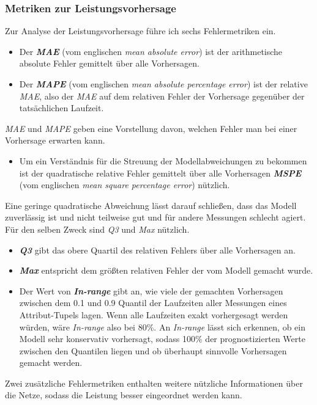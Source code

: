 \documentclass[
	12pt,
	a4paper,
	BCOR10mm,
	DIV14,
	listof=totoc,
	bibliography=totoc,
	headsepline
]{scrreprt}
\begin{document}
\subsubsection{Metriken zur Leistungsvorhersage}
Zur Analyse der Leistungsvorhersage führe ich sechs Fehlermetriken ein.
\begin{itemize}
	\item Der \textit{\textbf{MAE}} (vom englischen \textit{mean absolute error}) ist der arithmetische absolute Fehler gemittelt über alle Vorhersagen.
	\item Der \textit{\textbf{MAPE}} (vom englischen \textit{mean absolute percentage error}) ist der relative \textit{MAE}, also der \textit{MAE} auf dem relativen Fehler der Vorhersage gegenüber der tatsächlichen Laufzeit.\\
\end{itemize}
\textit{MAE} und \textit{MAPE} geben eine Vorstellung davon, welchen Fehler man bei einer Vorhersage erwarten kann.
\begin{itemize}
	\item Um ein Verständnis für die Streuung der Modellabweichungen zu bekommen ist der quadratische relative Fehler gemittelt über alle Vorhersagen \textit{\textbf{MSPE}} (vom englischen \textit{mean square percentage error}) nützlich.
\end{itemize}
	Eine geringe quadratische Abweichung lässt darauf schließen, dass das Modell zuverlässig ist und nicht teilweise gut und für andere Messungen schlecht agiert. Für den selben Zweck sind \textit{Q3} und \textit{Max} nützlich.
\begin{itemize}
	\item \textit{\textbf{Q3}} gibt das obere Quartil des relativen Fehlers über alle Vorhersagen an.
	\item \textit{\textbf{Max}} entspricht dem größten relativen Fehler der vom Modell gemacht wurde.
	\item Der Wert von \textit{\textbf{In-range}} gibt an, wie viele der gemachten Vorhersagen zwischen dem 0.1 und 0.9 Quantil der Laufzeiten aller Messungen eines Attribut-Tupels lagen.
	Wenn alle Laufzeiten exakt vorhergesagt werden würden, wäre \textit{In-range} also bei 80\%. An \textit{In-range} lässt sich erkennen, ob ein Modell sehr konservativ vorhersagt, sodass 100\% der prognostizierten Werte zwischen den Quantilen liegen und ob überhaupt sinnvolle Vorhersagen gemacht werden.
\end{itemize}
Zwei zusätzliche Fehlermetriken enthalten weitere nützliche Informationen über die Netze, sodass die Leistung besser eingeordnet werden kann.
\end{document}
